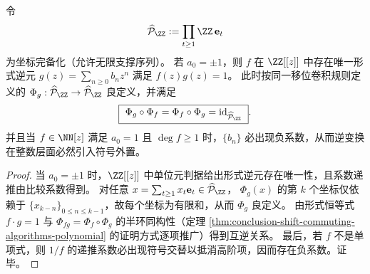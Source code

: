 \begin{proposition}[全序列完备化上的形式幂级数逆元]\label{prop:conclusion-prime-register-product-completion-invertibility}
令
\[
\widehat{\mathcal P}_{\ZZ}:=\prod_{t\ge 1}\ZZ\,\mathbf e_t
\]
为坐标完备化（允许无限支撑序列）。
若 \(a_0=\pm 1\)，则 \(f\) 在 \(\ZZ[[z]]\) 中存在唯一形式逆元 \(g(z)=\sum_{n\ge 0}b_n z^n\) 满足 \(f(z)g(z)=1\)。
此时按同一移位卷积规则定义的 \(\Phi_g:\widehat{\mathcal P}_{\ZZ}\to\widehat{\mathcal P}_{\ZZ}\) 良定义，并满足
\[
\boxed{\ \Phi_g\circ\Phi_f=\Phi_f\circ\Phi_g=\mathrm{id}_{\widehat{\mathcal P}_{\ZZ}}\ }.
\]
并且当 \(f\in\NN[z]\) 满足 \(a_0=1\) 且 \(\deg f\ge 1\) 时，\(\{b_n\}\) 必出现负系数，从而逆变换在整数层面必然引入符号外置。
\end{proposition}
\begin{proof}
当 \(a_0=\pm 1\) 时，\(\ZZ[[z]]\) 中单位元判据给出形式逆元存在唯一性，且系数递推由比较系数得到。
对任意 \(x=\sum_{t\ge 1}x_t\mathbf e_t\in\widehat{\mathcal P}_{\ZZ}\)，
\(\Phi_g(x)\) 的第 \(k\) 个坐标仅依赖于 \(\{x_{k-n}\}_{0\le n\le k-1}\)，故每个坐标为有限和，从而 \(\Phi_g\) 良定义。
由形式恒等式 \(f\cdot g=1\) 与 \(\Phi_{fg}=\Phi_f\circ\Phi_g\) 的半环同构性（定理 \ref{thm:conclusion-shift-commuting-algorithms-polynomial} 的证明方式逐项推广）得到互逆关系。
最后，若 \(f\) 不是单项式，则 \(1/f\) 的递推系数必出现符号交替以抵消高阶项，因而存在负系数。证毕。
\end{proof}

\endinput


